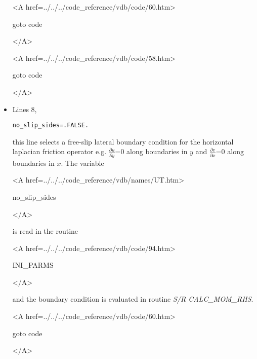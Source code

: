 \begin{itemize}
{\bf
\begin{rawhtml} <A href=../../../code_reference/vdb/code/60.htm> \end{rawhtml}
goto code
\begin{rawhtml} </A>\end{rawhtml}
}

{\bf
\begin{rawhtml} <A href=../../../code_reference/vdb/code/58.htm> \end{rawhtml}
goto code
\begin{rawhtml} </A>\end{rawhtml}
}

\item Lines 8,
\begin{verbatim}
no_slip_sides=.FALSE.
\end{verbatim}
this line selects a free-slip lateral boundary condition for
the horizontal laplacian friction operator 
e.g. $\frac{\partial u}{\partial y}$=0 along boundaries in $y$ and
$\frac{\partial v}{\partial x}$=0 along boundaries in $x$.
The variable
{\bf
\begin{rawhtml} <A href=../../../code_reference/vdb/names/UT.htm> \end{rawhtml}
no\_slip\_sides
\begin{rawhtml} </A>\end{rawhtml}
}
is read in the routine
{\it
\begin{rawhtml} <A href=../../../code_reference/vdb/code/94.htm> \end{rawhtml}
INI\_PARMS
\begin{rawhtml} </A>\end{rawhtml}
} and the boundary condition is evaluated in routine
{\it S/R CALC\_MOM\_RHS}.


{\bf
\begin{rawhtml} <A href=../../../code_reference/vdb/code/60.htm> \end{rawhtml}
goto code
\begin{rawhtml} </A>\end{rawhtml}
}


\end{itemize}
